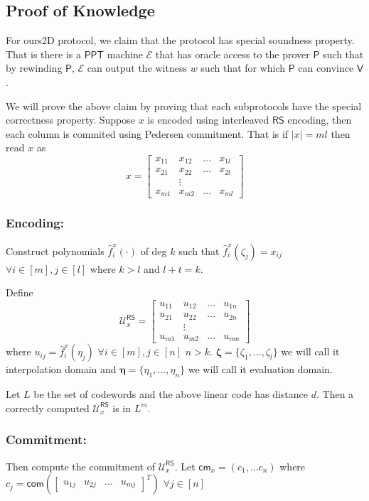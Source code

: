 \documentclass[runningheads]{llncs}
\newcommand{\name}{\textsf{ours}}
\def\ppt{\mathsf{PPT}}
\def\extrac{\mathcal{E}} %
\def\prover{\mathsf{P}}
\def\verifier{\mathsf{V}}
\def\RS{\mathsf{RS}} %
\def\cm{\mathsf{cm}} %
\def\com{\mathsf{com}} %
\def\oracle{\mathcal{U}^{\RS}}
\begin{document}
\subsection{Proof of Knowledge}
	For \name2D protocol, we claim that the protocol has special soundness property. That is there is a $\ppt$ machine $\extrac$ that has oracle access to the prover $\prover$ such that by rewinding $\prover$, $\extrac$ can output the witness $w$ such that for which $\prover$ can convince $\verifier$.
	
	We will prove the above claim by proving that each subprotocols have the special correctness property. 
	Suppose $x$ is encoded using interleaved $\RS$ encoding, then each column is commited using Pedersen commitment. That is if $|x|=ml$ then read $x$ as 
	$$x=
	\begin{bmatrix}
		x_{11} & x_{12} & \ldots & x_{1l}\\
		x_{21} & x_{22} & \ldots & x_{2l}\\
		& \vdots\\
		x_{m1} & x_{m2} & \ldots & x_{ml}
	\end{bmatrix}
	$$	
	\subsubsection{Encoding:}\label{subsec: encode} Construct polynomials $\hat{f}^x_i(\cdot)$ of deg $k$ such that $\hat{f}^x_i(\zeta_j)=x_{ij}$ $\forall i\in [m], j\in [l]$ where $k>l$ and $l+t=k$.
	
	Define 
	$$\oracle_x =
	\begin{bmatrix}
		u_{11} & u_{12} & \ldots & u_{1n}\\
		u_{21} & u_{22} & \ldots & u_{2n}\\
		& \vdots\\
		u_{m1} & u_{m2} & \ldots & u_{mn}
	\end{bmatrix}
	$$
	where $u_{ij}= \hat{f}^x_i(\eta_j)$ $\forall i\in[m], j\in[n]$ $n>k$. $\bm{\zeta}=\{\zeta_1,\ldots,\zeta_l\}$ we will call it interpolation domain and $\bm{\eta} = \{\eta_1,\ldots,\eta_n\}$ we will call it evaluation domain. 
	
	Let $L$ be the set of codewords and the above linear code has distance $d$. Then a correctly computed $\oracle_x$ is in $L^m$.
	
	\subsubsection{Commitment:}\label{subsec: commit} Then compute the commitment of $\oracle_x$. Let $\cm_x=(c_1,\ldots c_n)$ where $c_j= \com( \begin{bmatrix}
	u_{1j} & u_{2j} & \ldots & u_{mj}
	\end{bmatrix}^T)$ $\forall j\in [n]$
	
\end{document}
